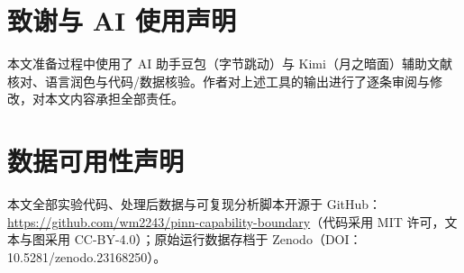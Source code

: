 \documentclass[fontset=windows,11pt]{ctexart}
\numberwithin{equation}{section}
\begin{document}
\FloatBarrier

\section*{致谢与 AI 使用声明}
本文准备过程中使用了 AI 助手豆包（字节跳动）与 Kimi（月之暗面）辅助文献核对、语言润色与代码/数据核验。作者对上述工具的输出进行了逐条审阅与修改，对本文内容承担全部责任。

\section*{数据可用性声明}
本文全部实验代码、处理后数据与可复现分析脚本开源于 GitHub：\url{https://github.com/wm2243/pinn-capability-boundary}（代码采用 MIT 许可，文本与图采用 CC-BY-4.0）；原始运行数据存档于 Zenodo（DOI：10.5281/zenodo.23168250）。
\end{document}
